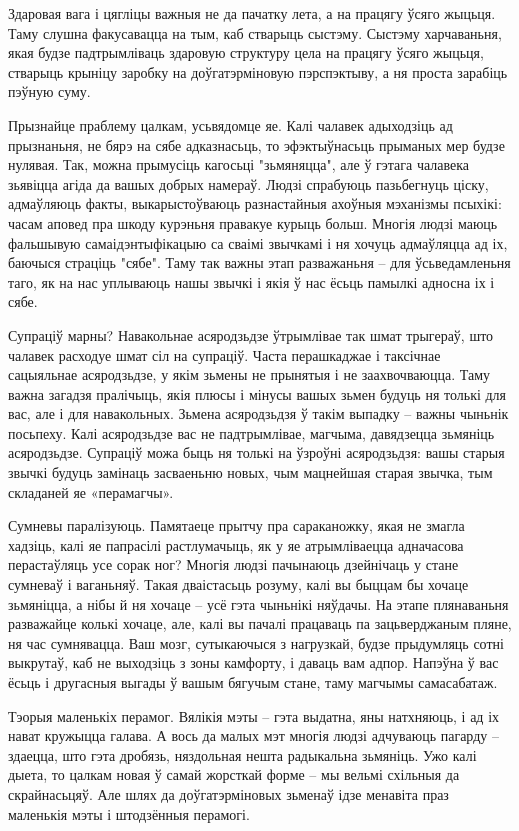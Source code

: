 Здаровая вага і цягліцы важныя не да пачатку лета, а на працягу ўсяго жыцьця. Таму слушна факусавацца на тым, каб стварыць сыстэму. Сыстэму харчаваньня, якая будзе падтрымліваць здаровую структуру цела на працягу ўсяго жыцьця, стварыць крыніцу заробку на доўгатэрміновую пэрспэктыву, а ня проста зарабіць пэўную суму.

Прызнайце праблему цалкам, усьвядомце яе. Калі чалавек адыходзіць ад прызнаньня, не бярэ на сябе адказнасьць, то эфэктыўнасьць прыманых мер будзе нулявая. Так, можна прымусіць кагосьці "зьмяняцца", але ў гэтага чалавека зьявіцца агіда да вашых добрых намераў. Людзі спрабуюць пазьбегнуць ціску, адмаўляюць факты, выкарыстоўваюць разнастайныя ахоўныя мэханізмы псыхікі: часам аповед пра шкоду курэньня правакуе курыць больш. Многія людзі маюць фальшывую самаідэнтыфікацыю са сваімі звычкамі і ня хочуць адмаўляцца ад іх, баючыся страціць "сябе". Таму так важны этап разважаньня – для ўсьведамленьня таго, як на нас уплываюць нашы звычкі і якія ў нас ёсьць памылкі адносна іх і сябе.

Супраціў марны? Навакольнае асяродзьдзе ўтрымлівае так шмат трыгераў, што чалавек расходуе шмат сіл на супраціў. Часта перашкаджае і таксічнае сацыяльнае асяродзьдзе, у якім зьмены не прынятыя і не заахвочваюцца. Таму важна загадзя пралічыць, якія плюсы і мінусы вашых зьмен будуць ня толькі для вас, але і для навакольных. Зьмена асяродзьдзя ў такім выпадку – важны чыньнік посьпеху. Калі асяродзьдзе вас не падтрымлівае, магчыма, давядзецца зьмяніць асяродзьдзе. Супраціў можа быць ня толькі на ўзроўні асяродзьдзя: вашы старыя звычкі будуць замінаць засваеньню новых, чым мацнейшая старая звычка, тым складаней яе «перамагчы».

Сумневы паралізуюць. Памятаеце прытчу пра сараканожку, якая не змагла хадзіць, калі яе папрасілі растлумачыць, як у яе атрымліваецца адначасова перастаўляць усе сорак ног? Многія людзі пачынаюць дзейнічаць у стане сумневаў і ваганьняў. Такая дваістасьць розуму, калі вы быццам бы хочаце зьмяніцца, а нібы й ня хочаце – усё гэта чыньнікі няўдачы. На этапе плянаваньня разважайце колькі хочаце, але, калі вы пачалі працаваць па зацьверджаным пляне, ня час сумнявацца. Ваш мозг, сутыкаючыся з нагрузкай, будзе прыдумляць сотні выкрутаў, каб не выходзіць з зоны камфорту, і даваць вам адпор. Напэўна ў вас ёсьць і другасныя выгады ў вашым бягучым стане, таму магчымы самасабатаж.

Тэорыя маленькіх перамог. Вялікія мэты – гэта выдатна, яны натхняюць, і ад іх нават кружыцца галава. А вось да малых мэт многія людзі адчуваюць пагарду – здаецца, што гэта дробязь, няздольная нешта радыкальна зьмяніць. Ужо калі дыета, то цалкам новая ў самай жорсткай форме – мы вельмі схільныя да скрайнасьцяў. Але шлях да доўгатэрміновых зьменаў ідзе менавіта праз маленькія мэты і штодзённыя перамогі.

